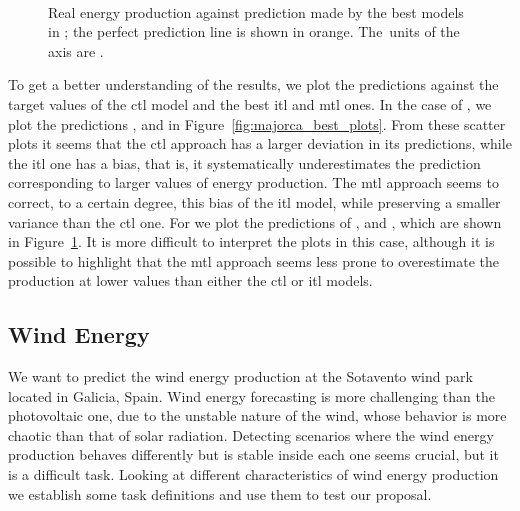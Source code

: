 \begin{figure}[t!]
    \centering%
    \quad%
    \quad%
    \\
 \caption{\label{fig:tenerife_best_plots} Real energy production against prediction made by the best models {in} ; the perfect prediction  line is shown in orange. The~units of the axis are \mwhu{}.}
\end{figure}


%
To get a better understanding of the results, we plot the predictions against the target values of the \acrshort{ctl} model and the best \acrshort{itl} and \acrshort{mtl} ones.
%
In the case of , we plot the predictions ,  and  in Figure~\ref{fig:majorca_best_plots}.
From these scatter plots it seems that the \acrshort{ctl} approach has a larger deviation in its predictions, while the \acrshort{itl} one has a bias, that is, it systematically underestimates the prediction corresponding to larger values of energy production.
The \acrshort{mtl} approach seems to correct, to a certain degree, this bias of the \acrshort{itl} model, while preserving a smaller variance than the \acrshort{ctl} one.
%
For  we plot the predictions of ,  and , which are shown in Figure~\ref{fig:tenerife_best_plots}.
It is more difficult to interpret the plots in this case, although it is possible to highlight that the \acrshort{mtl} approach seems less prone to overestimate the production at lower values than either the \acrshort{ctl} or \acrshort{itl} models.







\subsection{Wind Energy}
We want to predict the wind energy production at the Sotavento wind park located in Galicia, Spain.
Wind energy forecasting is more challenging than the photovoltaic one, due to the unstable nature of the wind, whose behavior is more chaotic than that of solar radiation. Detecting scenarios where the wind energy production behaves differently but is stable inside each one seems crucial, but it is a difficult task. Looking at different characteristics of wind energy production we establish some task definitions and use them to test our proposal. 

